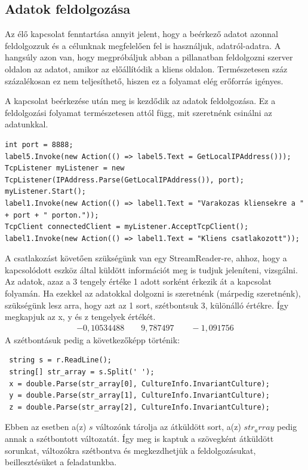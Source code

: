 \documentclass{thesis-ekf}
\theoremstyle{definition}
\theoremstyle{remark}
\begin{document}
\subsection{Adatok feldolgozása}
Az élő kapcsolat fenntartása annyit jelent, hogy a beérkező adatot azonnal feldolgozzuk és a célunknak megfelelően fel is használjuk, adatról-adatra. A hangsúly azon van, hogy megpróbáljuk abban a pillanatban feldolgozni szerver oldalon az adatot, amikor az előállítódik a kliens oldalon. Természetesen száz százalékosan ez nem teljesíthető, hiszen ez a folyamat elég erőforrás igényes.
\par A kapcsolat beérkezése után meg is kezdődik az adatok feldolgozása. Ez a feldolgozási folyamat természetesen attól függ, mit szeretnénk csinálni az adatunkkal.
\begin{lstlisting}
int port = 8888;
label5.Invoke(new Action(() => label5.Text = GetLocalIPAddress()));
TcpListener myListener = new TcpListener(IPAddress.Parse(GetLocalIPAddress()), port);
myListener.Start();
label1.Invoke(new Action(() => label1.Text = "Varakozas kliensekre a " + port + " porton."));
TcpClient connectedClient = myListener.AcceptTcpClient();
label1.Invoke(new Action(() => label1.Text = "Kliens csatlakozott"));
\end{lstlisting}
A csatlakozást követően szükségünk van egy StreamReader-re, ahhoz, hogy a kapcsolódott eszköz által küldött információt meg is tudjuk jeleníteni, vizsgálni.
Az adatok, azaz a 3 tengely értéke 1 adott sorként érkezik át a kapcsolat folyamán. Ha ezekkel az adatokkal dolgozni is szeretnénk (márpedig szeretnénk), szükségünk lesz arra, hogy azt az 1 sort, szétbontsuk 3, különálló értékre. Így megkapjuk az x, y és z tengelyek értékét.
\begin{align*}
-0,10534488 \qquad 9,787497 \qquad-1,091756
\end{align*}
 A szétbontásuk pedig a következőképp történik:
 \begin{lstlisting}
 string s = r.ReadLine();
 string[] str_array = s.Split(' ');
 x = double.Parse(str_array[0], CultureInfo.InvariantCulture);
 y = double.Parse(str_array[1], CultureInfo.InvariantCulture);
 z = double.Parse(str_array[2], CultureInfo.InvariantCulture);
 \end{lstlisting}
Ebben az esetben a(z) $s$ változónk tárolja az átküldött sort, a(z) $str_array$ pedig annak a szétbontott változatát. Így meg is kaptuk a szövegként átküldött sorunkat, változókra szétbontva és megkezdhetjük a feldolgozásukat, beillesztésüket a feladatunkba.
\end{document}
